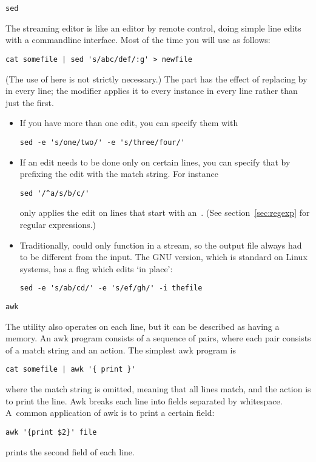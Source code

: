  {\tt sed}

The streaming editor  is like an editor by remote control,
doing simple line edits with a commandline interface. Most of the time
you will use  as follows:
\begin{verbatim}
cat somefile | sed 's/abc/def/:g' > newfile
\end{verbatim}
(The use of  here is not strictly necessary.)
The  part has the effect of replacing  by 
in every line; the  modifier applies it to every instance in
every line rather than just the first.

\begin{itemize}
\item If you have more than one edit, you can specify them with
\begin{verbatim}
sed -e 's/one/two/' -e 's/three/four/'
\end{verbatim}
\item If an edit needs to be done only on certain lines, you can
  specify that by prefixing the edit with the match string. For instance
\begin{verbatim}
sed '/^a/s/b/c/'
\end{verbatim}
only applies the edit on lines that start with an~. (See
section~\ref{sec:regexp} for regular expressions.)
\item Traditionally,  could only function in a stream, so
  the output file always had to be different from the input. The GNU
  version, which is standard on Linux systems, has a flag  which
  edits `in place':
\begin{verbatim}
sed -e 's/ab/cd/' -e 's/ef/gh/' -i thefile
\end{verbatim}
\end{itemize}

 {\tt awk}

The  utility also operates on each line, but it can be
described as having a memory. An awk program consists of a sequence of
pairs, where each pair consists of a match string and an action. The
simplest awk program is
\begin{verbatim}
cat somefile | awk '{ print }'
\end{verbatim}
where the match string is omitted, meaning that all lines match, and
the action is to print the line. Awk breaks each line into fields
separated by whitespace. A~common application of awk is to print a
certain field:
\begin{verbatim}
awk '{print $2}' file
\end{verbatim}
prints the second field of each line.

